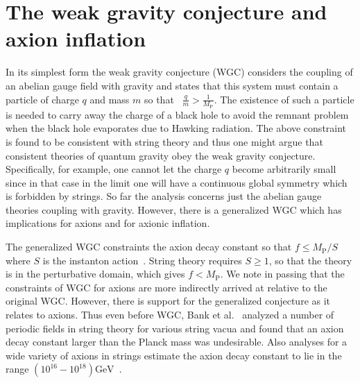\documentclass[11pt]{article}
\begin{document}
\section{The weak gravity conjecture and axion inflation \label{sec:WeakGravityConjecture}}
In its simplest form the weak gravity conjecture (WGC) considers the coupling of an abelian gauge field with gravity and states that this system must contain a particle of charge $q$ and mass $m$ so that~\cite{ArkaniHamed:2006dz} $\frac{q}{m} > \frac{1}{M_\text{P}}$.
The existence of such a particle is needed to carry away the charge of a black hole to avoid the remnant problem when the black hole evaporates due to Hawking radiation.
The above constraint is found to be consistent with string theory and thus one might argue that consistent theories of quantum gravity obey the weak gravity conjecture.
Specifically, for example, one cannot let the charge $q$ become arbitrarily small since in that case in the limit one will have a continuous global symmetry which is forbidden by strings.
So far the analysis concerns just the abelian gauge theories coupling with gravity.
However, there is a generalized WGC which has implications for axions and for axionic inflation.

The generalized WGC constraints the axion decay constant so that $f \leq M_\text{P} / S$ where $S$ is the instanton action~\cite{Brown:2015iha, Brown:2015lia, Heidenreich:2015wga}.
String theory requires $S \geq 1$, so that the theory is in the perturbative domain, which gives $f < M_\text{P}$.
We note in passing that the constraints of WGC for axions are more indirectly arrived at relative to the original WGC.
However, there is support for the generalized conjecture as it relates to axions.
Thus even before WGC, Bank et al.~\cite{Banks:2003sx} analyzed a number of periodic fields in string theory for various string vacua and found that an axion decay constant larger than the Planck mass was undesirable.
Also analyses for a wide variety of axions in strings estimate the axion decay constant to lie in the range $(10^{16} - 10^{18}) \text{GeV}$~\cite{Svrcek:2006yi}.
\end{document}
